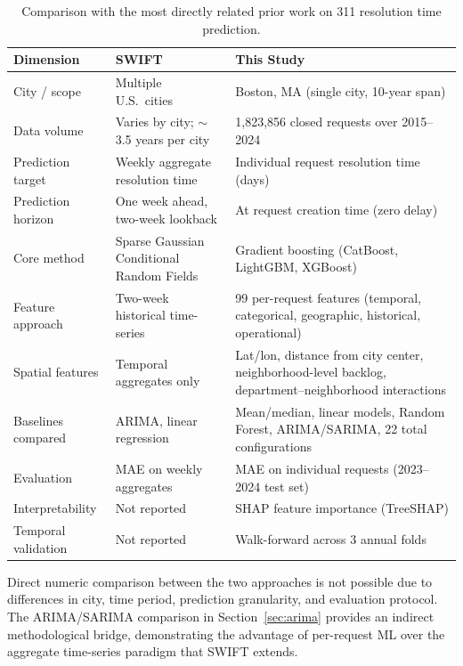 \documentclass[sigconf,nonacm]{acmart}
\begin{document}
\begin{table}[t]
\caption{Comparison with the most directly related prior work on
311 resolution time prediction.}
\label{tab:litcomp}
\centering
\small
\begin{tabular}{p{3.2cm}p{6.2cm}p{6.2cm}}
\toprule
\textbf{Dimension} & \textbf{SWIFT}~\cite{raj2021swift} &
  \textbf{This Study} \\
\midrule
City / scope & Multiple U.S.\ cities &
  Boston, MA (single city, 10-year span) \\
Data volume & Varies by city; $\sim$3.5 years per city &
  1,823,856 closed requests over 2015--2024 \\
Prediction target & Weekly aggregate resolution time &
  Individual request resolution time (days) \\
Prediction horizon & One week ahead, two-week lookback &
  At request creation time (zero delay) \\
Core method & Sparse Gaussian Conditional Random Fields &
  Gradient boosting (CatBoost, LightGBM, XGBoost) \\
Feature approach & Two-week historical time-series &
  99 per-request features (temporal, categorical,
  geographic, historical, operational) \\
Spatial features & Temporal aggregates only &
  Lat/lon, distance from city center, neighborhood-level
  backlog, department--neighborhood interactions \\
Baselines compared & ARIMA, linear regression &
  Mean/median, linear models, Random Forest, ARIMA/SARIMA,
  22 total configurations \\
Evaluation & MAE on weekly aggregates &
  MAE on individual requests (2023--2024 test set) \\
Interpretability & Not reported &
  SHAP feature importance (TreeSHAP) \\
Temporal validation & Not reported &
  Walk-forward across 3 annual folds \\
\bottomrule
\end{tabular}
\end{table}

Direct numeric comparison between the two approaches is not
possible due to differences in city, time period, prediction
granularity, and evaluation protocol. The ARIMA/SARIMA comparison
in Section~\ref{sec:arima} provides an indirect methodological
bridge, demonstrating the advantage of per-request ML over the
aggregate time-series paradigm that SWIFT extends.
\end{document}
